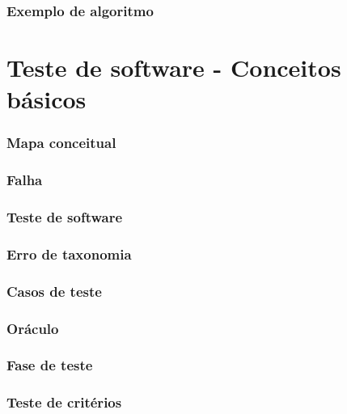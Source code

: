 \documentclass[utf8, usepdftitle=false, svgnames, color={table,
fixpdftex, hyperref, fixinclude, xcdraw}, t, brazil]{beamer}
\begin{document}
 \section{Exemplo de algoritmo}
 
 
 \part{Teste de software - Conceitos básicos}
 
 \section{Mapa conceitual}
 
 
 \section{Falha}
 
 
 \section{Teste de software}
 
 
 \section{Erro de taxonomia}
 
 
 \section{Casos de teste}
 
 
 \section{Oráculo}
 
 
 \section{Fase de teste}
 
 
 \section{Teste de critérios}
 
 
\end{document}
